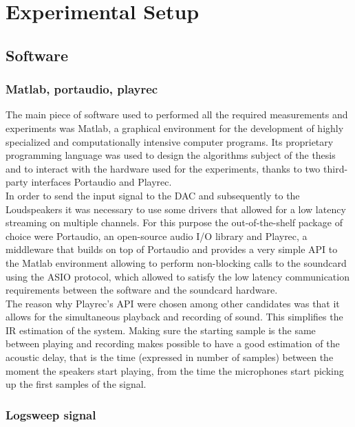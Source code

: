\chapter{Experimental Setup} %

\label{Chapter3} %

\section{Software}
\subsection{Matlab, portaudio, playrec}{}
\label{subsec:matlab}

The main piece of software used to performed all the required measurements and experiments was Matlab, a graphical environment for the development of highly specialized and computationally intensive computer programs. Its proprietary programming language was used to design the algorithms subject of the thesis and to interact with the hardware used for the experiments, thanks to two third-party interfaces Portaudio and Playrec.
\\
In order to send the input signal to the DAC and subsequently to the Loudspeakers it was necessary to use some drivers that allowed for a low latency streaming on multiple channels. For this purpose the out-of-the-shelf package of choice were Portaudio, an open-source audio I/O library and Playrec, a middleware that builds on top of Portaudio and provides a very simple API to the Matlab environment allowing to perform non-blocking calls to the soundcard using the ASIO protocol, which allowed to satisfy the low latency communication requirements between the software and the soundcard hardware.
\\
The reason why Playrec's API were chosen among other candidates was that it allows for the simultaneous playback and recording of sound. This simplifies the IR estimation of the system. Making sure the starting sample is the same between playing and recording makes possible to have a good estimation of the acoustic delay, that is the time (expressed in number of samples) between the moment the speakers start playing, from the time the microphones start picking up the first samples of the signal.

\subsection{Logsweep signal}{}
\label{sec:logsweep}

